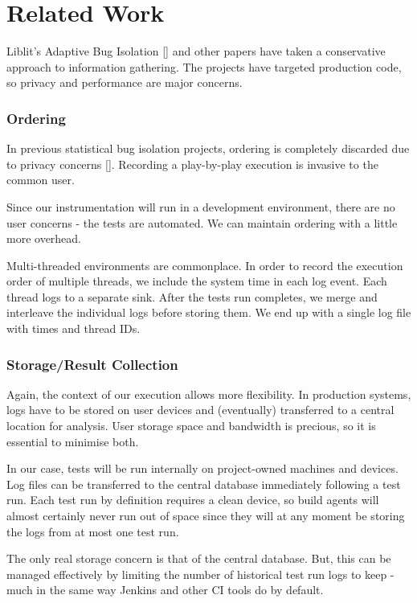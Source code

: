 \section{Related Work}
\label{sec:relwork}

Liblit’s Adaptive Bug Isolation [] and other papers have taken a conservative approach to information gathering. The projects have targeted production code, so privacy and performance are major concerns.


\subsubsection{Ordering}

In previous statistical bug isolation projects, ordering is completely discarded due to privacy concerns []. Recording a play-by-play execution is invasive to the common user.

Since our instrumentation will run in a development environment, there are no user concerns - the tests are automated. We can maintain ordering with a little more overhead.

Multi-threaded environments are commonplace. In order to record the execution order of multiple threads, we include the system time in each log event. Each thread logs to a separate sink. After the tests run completes, we merge and interleave the individual logs before storing them. We end up with a single log file with times and thread IDs.


\subsubsection{Storage/Result Collection}

Again, the context of our execution allows more flexibility. In production systems, logs have to be stored on user devices and (eventually) transferred to a central location for analysis. User storage space and bandwidth is precious, so it is essential to minimise both.

In our case, tests will be run internally on project-owned machines and devices. Log files can be transferred to the central database immediately following a test run. Each test run by definition requires a clean device, so build agents will almost certainly never run out of space since they will at any moment be storing the logs from at most one test run.

The only real storage concern is that of the central database. But, this can be managed effectively by limiting the number of historical test run logs to keep - much in the same way Jenkins and other CI tools do by default.


